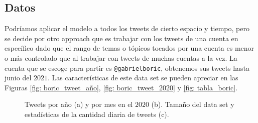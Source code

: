 \documentclass{article}
\begin{document}
\subsection{Datos}
	Podríamos aplicar el modelo a todos los tweets de cierto espacio y tiempo, pero se decide por otro approach que es trabajar con los tweets de una cuenta en específico dado que el rango de temas o tópicos tocados por una cuenta es menor o más controlado que al trabajar con tweets de muchas cuentas a la vez. La cuenta que se escoge para partir es \texttt{@gabrielboric}, obtenemos sus tweets hasta junio del $2021$. Las características de este data set se pueden apreciar en las Figuras \ref{fig: boric_tweet_año}, \ref{fig: boric_tweet_2020} y \ref{fig: tabla_boric}.

	
	
	
 	\begin{figure}[H]
 		\centering
	 	\vfill
 		\caption{Tweets por año (a) y por mes en el $2020$ (b). Tamaño del data set y estadísticas de la cantidad diaria de tweets (c).}
 	\end{figure}
	
\end{document}
